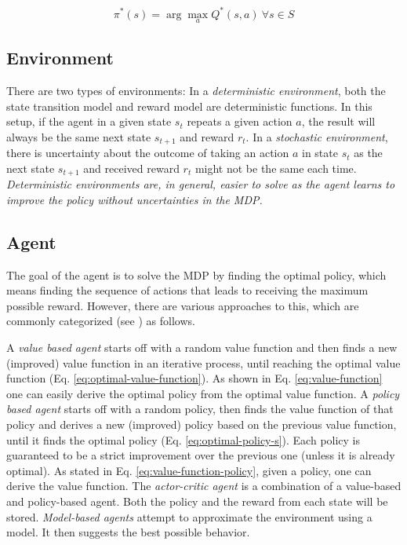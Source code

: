 \begin{equation}\label{eq:optimal-policy-s}
\pi^*(s)=\arg \max_{a} Q^*(s, a)\ \forall{s}\in{S}
\end{equation}

\subsection{Environment}
\label{sec:rl-environment}

There are two types of environments:
In a \textit{deterministic environment}, both the state transition model and reward model are deterministic functions. 
In this setup, if the agent in a given state $s_t$ repeats a given action $a$, the result will always be the same next state $s_{t+1}$ and reward $r_t$.
In a \textit{stochastic environment}, there is uncertainty about the outcome of taking an action $a$ in state $s_t$ as the next state $s_{t+1}$ and received reward $r_t$ might not be the same each time.
\textit{Deterministic environments are, in general, easier to solve as the agent learns to improve the policy without uncertainties in the MDP. }

\subsection{Agent}
\label{sec:rl-agent}

The goal of the agent is to solve the MDP by finding the optimal policy, which means finding the sequence of actions that leads to receiving the maximum possible reward.
However, there are various approaches to this, which are commonly categorized (see \cite{rl-demysitifed2}) as follows.

A \textit{value based agent} starts off with a random value function and then finds a new (improved) value function in an iterative process, until reaching the optimal value function (Eq. \ref{eq:optimal-value-function}). 
As shown in Eq. \ref{eq:value-function} one can easily derive the optimal policy from the optimal value function. 
A \textit{policy based agent} starts off with a random policy, then finds the value function of that policy and derives a new (improved) policy based on the previous value function, until it finds the optimal policy (Eq. \ref{eq:optimal-policy-s}). 
Each policy is guaranteed to be a strict improvement over the previous one (unless it is already optimal). 
As stated in Eq. \ref{eq:value-function-policy}, given a policy, one can derive the value function.
The \textit{actor-critic agent} is a combination of a value-based and policy-based agent. Both the policy and the reward from each state will be stored.
\textit{Model-based agents} attempt to approximate the environment using a model. It then suggests the best possible behavior.

